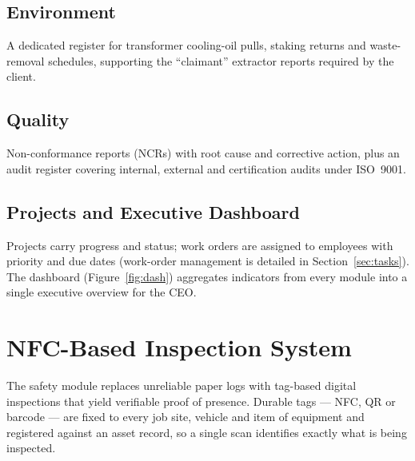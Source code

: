 \documentclass[11pt]{article}
\begin{document}
\subsection{Environment}
A dedicated register for transformer cooling-oil pulls, staking returns and waste-removal schedules,
supporting the ``claimant'' extractor reports required by the client.

\subsection{Quality}
Non-conformance reports (NCRs) with root cause and corrective action, plus an audit register covering
internal, external and certification audits under ISO~9001.

\subsection{Projects and Executive Dashboard}
Projects carry progress and status; work orders are assigned to employees with priority and due dates
(work-order management is detailed in Section~\ref{sec:tasks}).
The dashboard (Figure~\ref{fig:dash}) aggregates indicators from every module into a single executive
overview for the CEO.

\section{NFC-Based Inspection System}\label{sec:nfc}
The safety module replaces unreliable paper logs with tag-based digital inspections that yield
verifiable proof of presence. Durable tags --- NFC, QR or barcode --- are fixed to every job site,
vehicle and item of equipment and registered against an asset record, so a single scan identifies
exactly what is being inspected.
\end{document}
